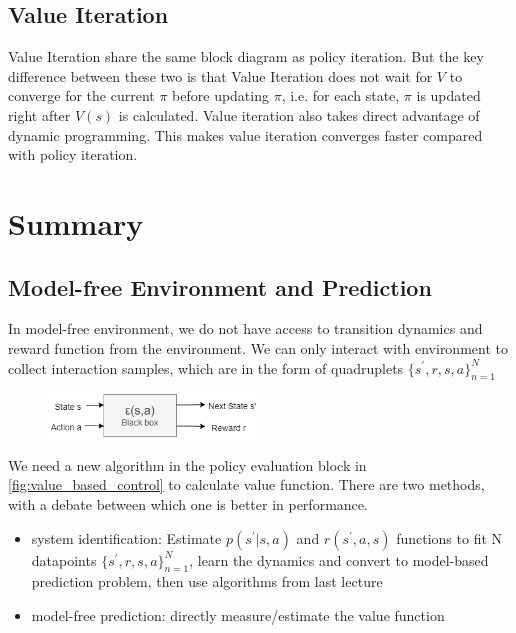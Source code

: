 \documentclass[11pt]{article}
\begin{document}
\subsection{Value Iteration}
Value Iteration share the same block diagram as policy iteration. But the key difference between these two is that Value Iteration does not wait for $V$
to converge for the current $\pi$ before updating $\pi$, i.e. for each state, $\pi$ is updated right after $V(s)$ is calculated. Value iteration also takes direct advantage of dynamic programming. This makes value iteration converges faster compared with policy iteration.

\clearpage
\section{Summary}
\subsection{Model-free Environment and Prediction}
In model-free environment, we do not have access to transition dynamics and reward function from the environment. We can only interact with environment to collect interaction samples, which are in the form of quadruplets $\{s^\prime, r, s, a\}_{n=1}^N$
\begin{figure}[H]
    \centering
    \includegraphics[width=0.5\textwidth]{pic/model_free_environment.png}
\end{figure}

We need a new algorithm in the policy evaluation block in \ref{fig:value_based_control} to calculate value function. There are two methods, with a debate between which one is better in performance.
\begin{itemize}
    \item system identification: Estimate $p(s^\prime|s,a)$ and $r(s^\prime, a, s)$ functions to fit N datapoints $\{s^\prime, r, s, a\}_{n=1}^N$, learn the dynamics and convert to model-based prediction problem, then use algorithms from last lecture
    \item model-free prediction: directly measure/estimate the value function
\end{itemize}
\end{document}
